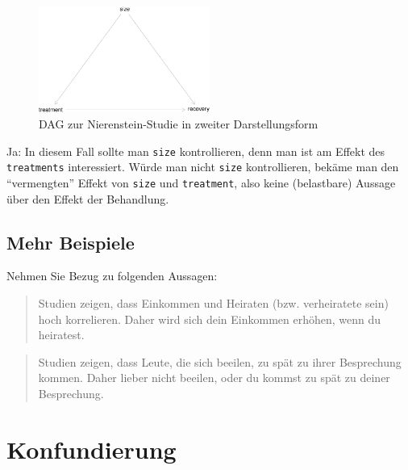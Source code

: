 \documentclass[
  a4paper,
  DIV=11]{scrreprt}
\theoremstyle{definition}
\theoremstyle{remark}
\begin{document}
\begin{figure}

{\centering \includegraphics[width=0.5\textwidth,height=\textheight]{./kausal_files/figure-pdf/fig-dag-studie-c2-1.pdf}

}

\caption{\label{fig-dag-studie-c2}DAG zur Nierenstein-Studie in zweiter
Darstellungsform}

\end{figure}

Ja: In diesem Fall sollte man \texttt{size} kontrollieren, denn man ist
am Effekt des \texttt{treatments} interessiert. Würde man nicht
\texttt{size} kontrollieren, bekäme man den ``vermengten'' Effekt von
\texttt{size} und \texttt{treatment}, also keine (belastbare) Aussage
über den Effekt der Behandlung.

\hypertarget{mehr-beispiele}{%
\subsection{Mehr Beispiele}\label{mehr-beispiele}}

Nehmen Sie Bezug zu folgenden Aussagen:

\begin{quote}
Studien zeigen, dass Einkommen und Heiraten (bzw. verheiratete sein)
hoch korrelieren. Daher wird sich dein Einkommen erhöhen, wenn du
heiratest.
\end{quote}

\begin{quote}
Studien zeigen, dass Leute, die sich beeilen, zu spät zu ihrer
Besprechung kommen. Daher lieber nicht beeilen, oder du kommst zu spät
zu deiner Besprechung.
\end{quote}

\hypertarget{konfundierung}{%
\section{Konfundierung}\label{konfundierung}}

\newcommand{\indep}{\perp \!\!\! \perp}
\end{document}
